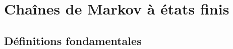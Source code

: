 \documentclass{article}
\begin{document}
\newpage

% 


\section{Chaînes de Markov à états finis}

\subsection{Définitions fondamentales}

\end{document}
